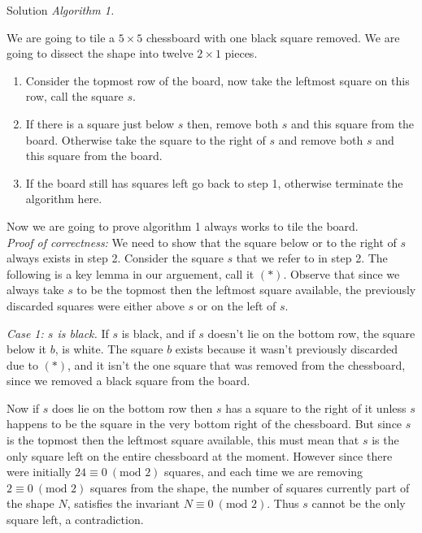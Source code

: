 \documentclass{article}
\begin{document}
\begin{solution}{Solution}
\textit{Algorithm 1.}
\vspace{0.2cm}

We are going to tile a $5\times 5$ chessboard with one black square
removed. We are going to dissect the shape into twelve $2 \times 1$ pieces.

\begin{enumerate}
\item Consider the topmost row of the board, now take the leftmost
square on this row, call the square $s$.
\item If there is a square just below $s$ then, remove both $s$ and this
square from the board. Otherwise take the square to the right of $s$ and
remove both $s$ and this square from the board.
\item If the board still has squares left go back to step 1, otherwise
terminate the algorithm here.
\end{enumerate}
\vspace{0.2cm}

Now we are going to prove algorithm 1 always works to tile the board.
\\

\textit{Proof of correctness:} We need to show that the square below or
to the right of $s$ always exists in step 2.
Consider the square $s$ that we refer to in step 2.
The following is a key lemma in our arguement, call it $(*)$.
Observe that since we always take $s$ to be the topmost then the leftmost
square available, the previously discarded squares were either above $s$
or on the left of $s$.
\vspace{0.2cm}

\textit{Case 1: $s$ is black.}
If $s$ is black, and if $s$ doesn't lie on the bottom row,
the square below it $b$, is white. The square $b$ exists because it wasn't
previously discarded due to $(*)$, and
it isn't the one square that was removed from the chessboard, since we
removed a black square from the board. \vspace{0.2cm}

Now if $s$ does lie on the bottom row
then $s$ has a square to the right of it unless $s$ happens to be the
square in the very bottom right of the chessboard. But since $s$ is the
topmost then the leftmost square available, this must
mean that $s$ is the only square left on the entire chessboard at the
moment. However since there were initially
$24 \equiv 0 \ (\text{mod } 2)$ squares, and each time we
are removing $2 \equiv 0 \ (\text{mod } 2)$ squares from the shape, the
number of squares currently part of the shape $N$, satisfies the invariant
$N \equiv 0 \ (\text{mod } 2)$. Thus $s$ cannot be the only square left,
a contradiction.
\vspace{0.2cm}


\end{solution}
\end{document}
